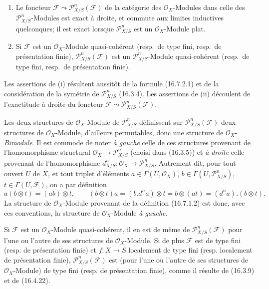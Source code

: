 \begin{proposition}[16.7.3]
\label{IV.16.7.3}
\begin{enumerate}
\item[\textup{(i)}] Le foncteur
$\mathscr{F}\leadsto\mathscr{P}_{X/S}^n(\mathscr{F})$ de la catégorie des
$\mathcal{O}_X$-Modules dans celle des $\mathscr{P}_{X/S}^n$-Modules est
exact à droite, et commute aux limites inductives quelconques; il est exact
lorsque $\mathscr{P}_{X/S}^n$ est un $\mathcal{O}_X$-Module plat.
\item[\textup{(ii)}] Si $\mathscr{F}$ est un $\mathcal{O}_X$-Module quasi-cohérent
\textup{(resp.}\ de type fini, \textup{resp.}\ de présentation finie\textup{)},
$\mathscr{P}_{X/S}^n(\mathscr{F})$ est un $\mathscr{P}_{X/S}^n$-Module
quasi-cohérent \textup{(resp.}\ de type fini, \textup{resp.}\ de présentation finie\textup{)}.
\end{enumerate}
\end{proposition}

Les assertions de (i) résultent aussitôt de la formule (16.7.2.1) et de la
considération de la symétrie de $\mathscr{P}_{X/S}^n$ (16.3.4). Les assertions
de (ii) découlent de l'exactitude à droite du foncteur
$\mathscr{F}\leadsto\mathscr{P}_{X/S}^n(\mathscr{F})$.

\begin{env}[16.7.4]
\label{IV.16.7.4}
Les deux structures de $\mathcal{O}_X$-Module de $\mathscr{P}_{X/S}^n$
définissent sur $\mathscr{P}_{X/S}^n(\mathscr{F})$ deux structures de
$\mathcal{O}_X$-Module, d'ailleurs permutables, donc une structure de
$\mathcal{O}_X$-\emph{Bimodule}. Il est commode de noter \emph{à gauche} celle de
ces structures provenant de l'homomorphisme structural
$\mathcal{O}_X\to\mathscr{P}_{X/S}^n$ (choisi dans (16.3.5)) et
\emph{à droite} celle provenant de l'homomorphisme
$d_{X/S}^n:\mathcal{O}_X\to\mathscr{P}_{X/S}^n$. Autrement dit, pour tout
ouvert $U$ de $X$, et tout triplet d'éléments
$a\in\Gamma(U,\mathcal{O}_X)$, $b\in\Gamma(U,\mathscr{P}_{X/S}^n)$,
$t\in\Gamma(U,\mathscr{F})$, on a par définition
\[
  a(b\otimes t)=(ab)\otimes t,\qquad
  (b\otimes t)a=(b.d^na)\otimes t=b\otimes(at)
  =(d^na).(b\otimes t).
  \tag{16.7.4.1}
  \label{IV.16.7.4.1}
\]
La structure de $\mathcal{O}_X$-Module provenant de la définition (16.7.1.2)
est donc, avec ces conventions, la structure de $\mathcal{O}_X$-Module \emph{à
gauche}.

Si $\mathscr{F}$ est un $\mathcal{O}_X$-Module quasi-cohérent, il en est de
même de $\mathscr{P}_{X/S}^n(\mathscr{F})$ pour l'une ou l'autre de ses
structures de $\mathcal{O}_X$-Module. Si de plus $\mathscr{F}$ est de type
fini (resp. de présentation finie) et $f:X\to S$ localement de type fini
(resp. localement de présentation finie),
$\mathscr{P}_{X/S}^n(\mathscr{F})$ est (pour l'une ou l'autre de ses
structures de $\mathcal{O}_X$-Module) de type fini (resp. de présentation
finie), comme il résulte de (16.3.9) et de (16.4.22).
\end{env}

